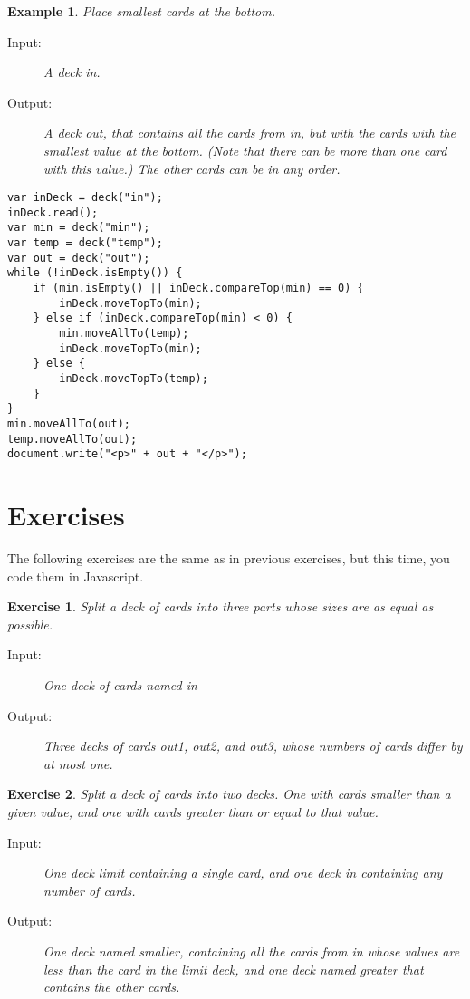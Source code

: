 \documentclass[a4paper,twoside]{tufte-handout}
\newtheorem{exercise}{Exercise}
\newtheorem{example}{Example}
\begin{document}
\begin{example}\label{smallbottom}
  Place smallest cards at the bottom.
  \begin{description}
  \item[Input:] A deck \emph{in}.
  \item[Output:] A deck \emph{out}, that contains all the cards from
    in, but with the cards with the smallest value at the
    bottom. (Note that there can be more than one card with this
    value.) The other cards can be in any order.
 \end{description}
\begin{lstlisting}
var inDeck = deck("in");
inDeck.read();
var min = deck("min");
var temp = deck("temp");
var out = deck("out");
while (!inDeck.isEmpty()) {
    if (min.isEmpty() || inDeck.compareTop(min) == 0) {
        inDeck.moveTopTo(min);
    } else if (inDeck.compareTop(min) < 0) {
        min.moveAllTo(temp);
        inDeck.moveTopTo(min);
    } else {
        inDeck.moveTopTo(temp);
    }
}
min.moveAllTo(out);
temp.moveAllTo(out);
document.write("<p>" + out + "</p>");
\end{lstlisting}
\end{example}

\clearpage


\section{Exercises}\label{sec-editrun}

The following exercises are the same as in previous exercises, but
this time, you code them in Javascript.

\begin{exercise}
  Split a deck of cards into three parts whose sizes are as equal as possible.
  \begin{description}
  \item[Input:] One deck of cards named \emph{in}
  \item[Output:] Three decks of cards \emph{out1}, \emph{out2}, and
    \emph{out3}, whose numbers of cards differ by at most one.
 \end{description}
\end{exercise}

\begin{exercise}
  Split a deck of cards into two decks. One with cards smaller than a
  given value, and one with cards greater than or equal to that value.
  \begin{description}
  \item[Input:] One deck \emph{limit} containing a single card, and one
    deck \emph{in} containing any number of cards.
  \item[Output:] One deck named \emph{smaller}, containing all the
    cards from \emph{in} whose values are less than the card in the
    \emph{limit} deck, and one deck named \emph{greater} that contains
    the other cards.
  \end{description}
\end{exercise}
\end{document}
